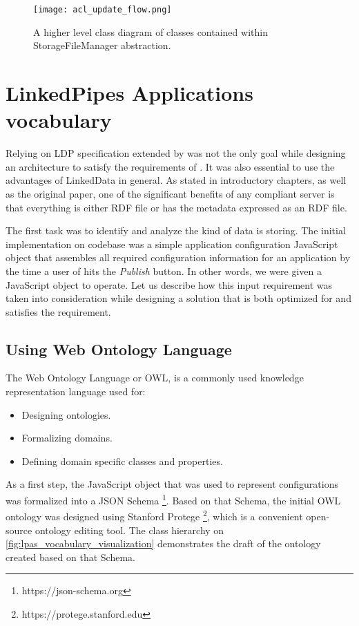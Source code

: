\begin{figure}[h]
\centering
\texttt{[image: acl\_update\_flow.png]}
\caption{A higher level class diagram of classes contained within StorageFileManager abstraction.}
\label{fig:lps_acl_update_flow}
\end{figure}


\section{LinkedPipes Applications vocabulary}

Relying on LDP specification extended by \solid{} was not the only goal while designing an architecture to satisfy the requirements of \lpa{}. It was also essential to use the advantages of LinkedData in general. As stated in introductory chapters, as well as the original paper, one of the significant benefits of any \solid{} compliant server is that everything is either RDF file or has the metadata expressed as an RDF file.  

The first task was to identify and analyze the kind of data \lpa{} is storing. The initial implementation on \lpa{} codebase was a simple application configuration JavaScript object that assembles all required configuration information for an application by the time a user of \lpa{} hits the \textit{Publish} button. In other words, we were given a JavaScript object to operate. Let us describe how this input requirement was taken into consideration while designing a solution that is both optimized for \solid{} and satisfies the requirement. 


\subsection{Using Web Ontology Language}

The Web Ontology Language or OWL, is a commonly used knowledge representation language used for:
\begin{itemize}
	\item Designing ontologies.
	\item Formalizing domains.
	\item Defining domain specific classes and properties.
\end{itemize}

As a first step, the JavaScript object that was used to represent \lpa{} configurations was formalized into a JSON Schema \footnote{https://json-schema.org}. Based on that Schema, the initial OWL ontology was designed using Stanford Protege \footnote{https://protege.stanford.edu}, which is a convenient open-source ontology editing tool. The class hierarchy on \autoref{fig:lpas_vocabulary_visualization} demonstrates the draft of the ontology created based on that Schema.

